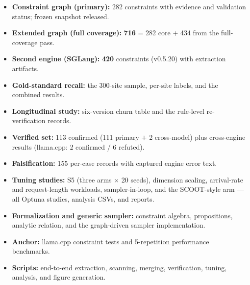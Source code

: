 \documentclass[journal]{IEEEtran}
\begin{document}
\begin{itemize}
  \item \textbf{Constraint graph (primary):} 282 constraints with evidence and validation status; frozen snapshot released.
  \item \textbf{Extended graph (full coverage):} \textbf{716} = 282 core $+$ 434 from the full-coverage pass.
  \item \textbf{Second engine (SGLang):} \textbf{420} constraints (v0.5.20) with extraction artifacts.
  \item \textbf{Gold-standard recall:} the 300-site sample, per-site labels, and the combined results.
  \item \textbf{Longitudinal study:} six-version churn table and the rule-level re-verification records.
  \item \textbf{Verified set:} 113 confirmed (111 primary $+$ 2 cross-model) plus cross-engine results (llama.cpp: 2 confirmed / 6 refuted).
  \item \textbf{Falsification:} 155 per-case records with captured engine error text.
  \item \textbf{Tuning studies:} S5 (three arms $\times$ 20 seeds), dimension scaling, arrival-rate and request-length workloads, sampler-in-loop, and the SCOOT-style arm --- all Optuna studies, analysis CSVs, and reports.
  \item \textbf{Formalization and generic sampler:} constraint algebra, propositions, analytic relation, and the graph-driven sampler implementation.
  \item \textbf{Anchor:} llama.cpp constraint tests and 5-repetition performance benchmarks.
  \item \textbf{Scripts:} end-to-end extraction, scanning, merging, verification, tuning, analysis, and figure generation.
\end{itemize}
\end{document}
